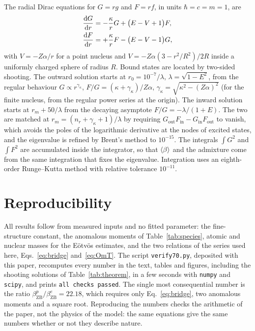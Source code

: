 \documentclass[%
 reprint, amsmath,amssymb, aps, prb, ]{revtex4-2}
\numberwithin{equation}{section}
\newcommand{\betaZB}{\beta_{\text{ZB}}}
\begin{document}
The radial Dirac equations for $G = rg$ and $F = rf$, in units $\hbar = c = m = 1$, are
\begin{align}
\dv{G}{r} &= -\frac{\kappa}{r}G + \bigl(E - V + 1\bigr)F,
\label{eq:radial1}\\
\dv{F}{r} &= +\frac{\kappa}{r}F - \bigl(E - V - 1\bigr)G,
\label{eq:radial2}
\end{align}
with $V = -Z\alpha/r$ for a point nucleus and $V = -Z\alpha(3 - r^{2}/R^{2})/2R$ inside a uniformly charged sphere of radius $R$. Bound states are located by two-sided shooting. The outward solution starts at $r_0 = 10^{-7}/\lambda$, $\lambda = \sqrt{1-E^{2}}$, from the regular behaviour $G \propto r^{\gamma_\kappa}$, $F/G = (\kappa + \gamma_\kappa)/Z\alpha$, $\gamma_\kappa = \sqrt{\kappa^{2} - (Z\alpha)^{2}}$ (for the finite nucleus, from the regular power series at the origin). The inward solution starts at $r_m + 50/\lambda$ from the decaying asymptote $F/G = -\lambda/(1+E)$. The two are matched at $r_m = (n_r + \gamma_\kappa + 1)/\lambda$ by requiring $G_{\text{out}}F_{\text{in}} - G_{\text{in}}F_{\text{out}}$ to vanish, which avoids the poles of the logarithmic derivative at the nodes of excited states, and the eigenvalue is refined by Brent's method to $10^{-15}$. The integrals $\int G^{2}$ and $\int F^{2}$ are accumulated inside the integrator, so that $\expval{\beta}$ and the admixture come from the same integration that fixes the eigenvalue. Integration uses an eighth-order Runge--Kutta method with relative tolerance $10^{-11}$.

\section{Reproducibility}
\label{app:repro}

All results follow from measured inputs and no fitted parameter: the fine-structure constant, the anomalous moments of Table~\ref{tab:species}, atomic and nuclear masses for the E\"otv\"os estimates, and the two relations of the series used here, Eqs.~\eqref{eq:bridge} and~\eqref{eq:OmT}. The script \texttt{verify70.py}, deposited with this paper, recomputes every number in the text, tables and figures, including the shooting solutions of Table~\ref{tab:theorem}, in a few seconds with \texttt{numpy} and \texttt{scipy}, and prints \texttt{all checks passed}. The single most consequential number is the ratio $\betaZB^{p}/\betaZB^{e} = 22.18$, which requires only Eq.~\eqref{eq:bridge}, two anomalous moments and a square root. Reproducing the numbers checks the arithmetic of the paper, not the physics of the model: the same equations give the same numbers whether or not they describe nature.
\end{document}
